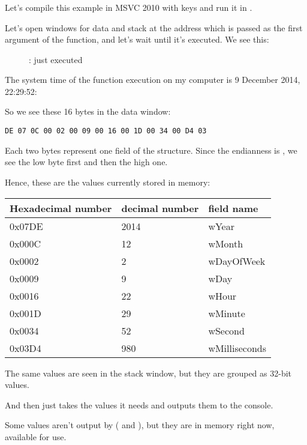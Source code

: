 ﻿\clearpage
\subsubsection{\olly}
\myindex{\olly}

Let's compile this example in MSVC 2010 with  keys and run it in \olly.

Let's open windows for data and stack at the address which is passed as the first argument of the
 function, and let's wait until it's executed. We see this:

\begin{figure}[H]
\centering
{}
\caption{\olly:  just executed}
\label{fig:struct_olly_1}
\end{figure}

The system time of the function execution on my computer is 9 December 2014, 22:29:52:



So we see these 16 bytes in the
data window: 
\begin{lstlisting}
DE 07 0C 00 02 00 09 00 16 00 1D 00 34 00 D4 03
\end{lstlisting}

Each two bytes represent one field of the structure. 
Since the \gls{endianness} is , 
we see the low byte first and then the high one.

Hence, these are the values currently stored in memory:

\begin{center}
\begin{tabular}{ | l | l | l | }
\hline
\headercolor{} Hexadecimal number & 
\headercolor{} decimal number & 
\headercolor{} field name \\
\hline
0x07DE & 2014	& wYear \\
\hline
0x000C & 12	& wMonth \\
\hline
0x0002 & 2	& wDayOfWeek \\
\hline
0x0009 & 9	& wDay \\
\hline
0x0016 & 22	& wHour \\
\hline
0x001D & 29	& wMinute \\
\hline
0x0034 & 52	& wSecond \\
\hline	
0x03D4 & 980	& wMilliseconds \\
\hline
\end{tabular}
\end{center}

The same values are seen in the stack window, but they are grouped as 32-bit values.

And then \printf just takes the values it needs and outputs them to the console.

Some values aren't output by \printf  ( and ), 
but they are in memory right now, available for use.


